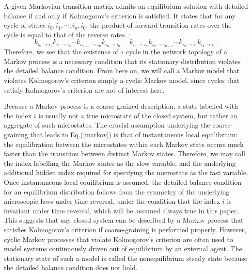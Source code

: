 \documentclass[aps,pre,amsmath,amssymb,floatfix,preprint,nofootinbib]{revtex4}
\begin{document}
   A given Markovian transition matrix admits an equilibrium solution with detailed balance if and only if Kolmogorov's criterion is satisfied. It states that for any cycle of states $i_0, i_1, \cdots, i_n, i_0$, the product of forward transition rates over the cycle is equal to that of the reverse rates~\cite{kogo,kelly}:
\begin{equation}
k_{i_0 \to i_1} k_{i_1 \to i_2} \cdots k_{i_{n-1} \to i_n} k_{i_{n} \to i_0} 
=  k_{i_0 \to i_n} k_{i_{n} \to i_{n-1} } \cdots k_{i_2 \to i_1}  k_{i_1 \to i_0} .\label{kobo}
\end{equation}
Therefore, we see that the existence of a cycle in the network topology of a Markov process is a necessary condition that its stationary distribution violates the detailed balance condition. From here on, we will call a Markov model that violates Kolmogorov's criterion simply a cyclic Markov model, since cycles that satisfy Kolmogorov's criterion are not of interest here. 

Because a Markov process is a coarse-grained description, a state labelled with the index $i$ is usually not a true microstate of  the closed system, but rather an aggregate of such microstates. 
The crucial assumption underlying the coarse-graining that leads to Eq.(\ref{markov}) is that of instantaneous local equilibrium: the equilibration between the microstates within each Markov state occurs much faster than the transition between distinct Markov states. Therefore, we may call the index labelling the Markov states as the slow variable, and the underlying additional hidden index required for specifying the microstate as the fast variable.
Once instantaneous local equilibrium is assumed, the detailed balance condition for an equilibrium distribution follows from the symmetry of the underlying microscopic laws under time reversal, under the condition that the index $i$ is invariant under time reversal, which will be assumed always true in this paper\cite{groot,zwan}. This suggests that any closed system can be described by a Markov process that satisfies Kolmogorov's criterion if coarse-graining is performed properly. However, cyclic Markov processes that violate Kolmogorov's criterion are often used to model systems continuously driven out of equilibrium by an external agent\cite{BS,cycle1,cycle2,wang,QH11,QH12,QH2,QHx1,QHx2,GQ1}. The stationary state of such a model is called the nonequilibrium steady state\cite{GQ2,QH11,QH12,QH2,QHx1,QHx2,GQ1,QH31,QH32,hi12} because the detailed balance condition does not hold. 
 
\end{document}

